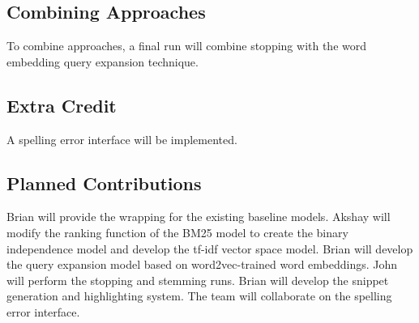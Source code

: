 \documentclass[conference]{IEEEtran}
\begin{document}
\subsection{Combining Approaches}
To combine approaches, a final run will combine stopping with the word embedding query expansion technique.

\subsection{Extra Credit}
A spelling error interface will be implemented.

\subsection{Planned Contributions}
Brian will provide the wrapping for the existing baseline models. Akshay will modify the ranking function of the BM25 model to create the binary independence model and develop the tf-idf vector space model. Brian will develop the query expansion model based on word2vec-trained word embeddings. John will perform the stopping and stemming runs. Brian will develop the snippet generation and highlighting system. The team will collaborate on the spelling error interface.

{}

\end{document}
